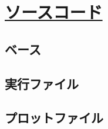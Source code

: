 \chapter{\href{https://github.com/m-agnet/Report.git}{ソースコード}}

\section{ベース}

\section{実行ファイル}

\section{プロットファイル}

